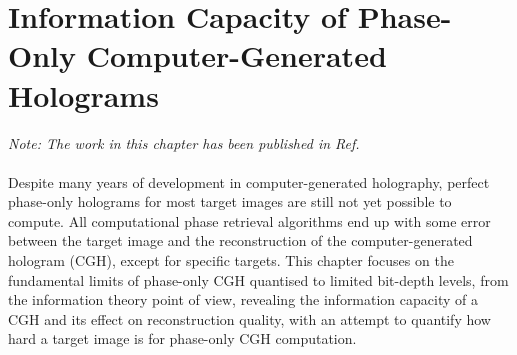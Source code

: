 \chapter{Information Capacity of Phase-Only Computer-Generated Holograms}
\label{chapter:information capacity}

\graphicspath{{Chapter_Information_capacity/Figs/}}

\textit{Note: The work in this chapter has been published in Ref. \cite{Sha2024}}\\\\

Despite many years of development in computer-generated holography, perfect phase-only holograms for most target images are still not yet possible to compute. All computational phase retrieval algorithms end up with some error between the target image and the reconstruction of the computer-generated hologram (CGH), except for specific targets. This chapter focuses on the fundamental limits of phase-only CGH quantised to limited bit-depth levels, from the information theory point of view, revealing the information capacity of a CGH and its effect on reconstruction quality, with an attempt to quantify how hard a target image is for phase-only CGH computation.




